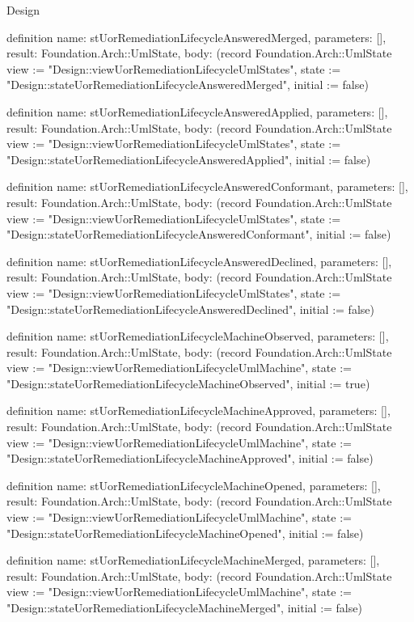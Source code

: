 \begin{lexlean}{Design}
\begin{semanticmodule}
definition{
  name: stUorRemediationLifecycleAnsweredMerged,
  parameters: [],
  result: Foundation.Arch::UmlState,
  body: (record Foundation.Arch::UmlState {view := "Design::viewUorRemediationLifecycleUmlStates", state := "Design::stateUorRemediationLifecycleAnsweredMerged", initial := false})
}

definition{
  name: stUorRemediationLifecycleAnsweredApplied,
  parameters: [],
  result: Foundation.Arch::UmlState,
  body: (record Foundation.Arch::UmlState {view := "Design::viewUorRemediationLifecycleUmlStates", state := "Design::stateUorRemediationLifecycleAnsweredApplied", initial := false})
}

definition{
  name: stUorRemediationLifecycleAnsweredConformant,
  parameters: [],
  result: Foundation.Arch::UmlState,
  body: (record Foundation.Arch::UmlState {view := "Design::viewUorRemediationLifecycleUmlStates", state := "Design::stateUorRemediationLifecycleAnsweredConformant", initial := false})
}

definition{
  name: stUorRemediationLifecycleAnsweredDeclined,
  parameters: [],
  result: Foundation.Arch::UmlState,
  body: (record Foundation.Arch::UmlState {view := "Design::viewUorRemediationLifecycleUmlStates", state := "Design::stateUorRemediationLifecycleAnsweredDeclined", initial := false})
}

definition{
  name: stUorRemediationLifecycleMachineObserved,
  parameters: [],
  result: Foundation.Arch::UmlState,
  body: (record Foundation.Arch::UmlState {view := "Design::viewUorRemediationLifecycleUmlMachine", state := "Design::stateUorRemediationLifecycleMachineObserved", initial := true})
}

definition{
  name: stUorRemediationLifecycleMachineApproved,
  parameters: [],
  result: Foundation.Arch::UmlState,
  body: (record Foundation.Arch::UmlState {view := "Design::viewUorRemediationLifecycleUmlMachine", state := "Design::stateUorRemediationLifecycleMachineApproved", initial := false})
}

definition{
  name: stUorRemediationLifecycleMachineOpened,
  parameters: [],
  result: Foundation.Arch::UmlState,
  body: (record Foundation.Arch::UmlState {view := "Design::viewUorRemediationLifecycleUmlMachine", state := "Design::stateUorRemediationLifecycleMachineOpened", initial := false})
}

definition{
  name: stUorRemediationLifecycleMachineMerged,
  parameters: [],
  result: Foundation.Arch::UmlState,
  body: (record Foundation.Arch::UmlState {view := "Design::viewUorRemediationLifecycleUmlMachine", state := "Design::stateUorRemediationLifecycleMachineMerged", initial := false})
}


\end{semanticmodule}
\end{lexlean}
